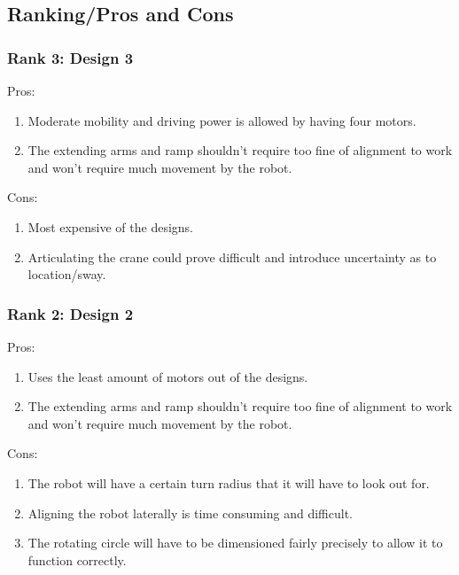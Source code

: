\documentclass[12pt]{extarticle}
\begin{document}
\subsection*{Ranking/Pros and Cons}
\subsubsection*{Rank 3: Design 3}
Pros:
\begin{enumerate}
    \item Moderate mobility and driving power is allowed by having four motors.
    \item The extending arms and ramp shouldn't require too fine of alignment to work and won't require much movement by the robot.
\end{enumerate}
Cons:
\begin{enumerate}
    \item Most expensive of the designs.
    \item Articulating the crane could prove difficult and introduce uncertainty as to location/sway.
\end{enumerate}

\subsubsection*{Rank 2: Design 2}
Pros:
\begin{enumerate}
    \item Uses the least amount of motors out of the designs.
    \item The extending arms and ramp shouldn't require too fine of alignment to work and won't require much movement by the robot.
\end{enumerate}
Cons:
\begin{enumerate}
    \item The robot will have a certain turn radius that it will have to look out for.
    \item Aligning the robot laterally is time consuming and difficult.
    \item The rotating circle will have to be dimensioned fairly precisely to allow it to function correctly.
\end{enumerate}
\end{document}
